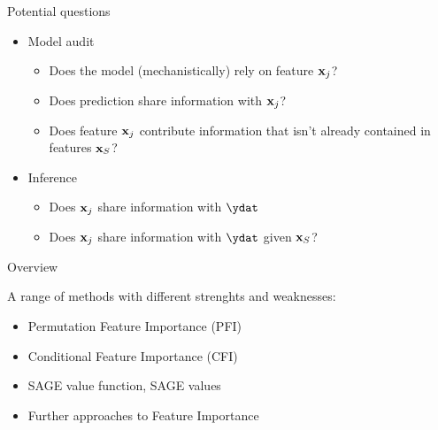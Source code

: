 \documentclass[11pt,compress,t,notes=noshow, xcolor=table]{beamer}
\begin{document}
\begin{vbframe}{Potential questions}

\begin{itemize}
  \item Model audit
  \begin{itemize}
    \item Does the model (mechanistically) rely on feature $\xj$?
    \item Does prediction share information with $\xj$?
    \item Does feature $\xj$ contribute information that isn't already contained in features $\xv_S$?
  \end{itemize}
  \item Inference
  \begin{itemize}
    \item Does $\xj$ share information with $\ydat$
    \item Does $\xj$ share information with $\ydat$ given $\xv_S$?
  \end{itemize}
\end{itemize}

\end{vbframe}


\begin{vbframe}{Overview}

A range of methods with different strenghts and weaknesses:

\begin{itemize}
  \item Permutation Feature Importance (PFI)
  \item Conditional Feature Importance (CFI)
  \item SAGE value function, SAGE values
  \item Further approaches to Feature Importance
\end{itemize}

\end{vbframe}

\endlecture
\end{document}
